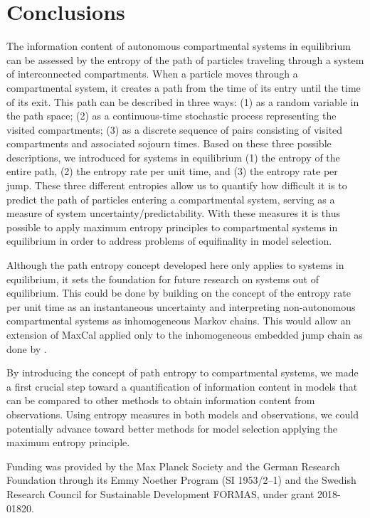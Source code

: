 \documentclass[smallextended]{svjour3}
\begin{document}
\section{Conclusions}
The information content of autonomous compartmental systems in equilibrium can be assessed by the entropy of the path of particles traveling through a system of interconnected compartments. When a particle moves through a compartmental system, it creates a path from the time of its entry until the time of its exit. This path can be described in three ways: (1) as a random variable in the path space; (2) as a continuous-time stochastic process representing the visited compartments; (3) as a discrete sequence of pairs consisting of visited compartments and associated sojourn times. 
Based on these three possible descriptions, we introduced for systems in equilibrium (1) the entropy of the entire path, (2) the entropy rate per unit time, and (3) the entropy rate per jump. These three different entropies allow us to quantify how difficult it is to predict the path of particles entering a compartmental system, serving as a measure of system uncertainty/predictability. With these measures it is thus possible to apply maximum entropy principles to compartmental systems in equilibrium in order to address problems of equifinality in model selection. 

Although the path entropy concept developed here only applies to systems in equilibrium, it sets the foundation for future research on systems out of equilibrium. 
This could be done by building on the concept of the entropy rate per unit time as an instantaneous uncertainty and interpreting non-autonomous compartmental systems as inhomogeneous Markov chains.
This would allow an extension of MaxCal applied only to the inhomogeneous embedded jump chain as done by \citet{Ge2012JCP}.

By introducing the concept of path entropy to compartmental systems, we made a first crucial step toward a quantification of information content in models that can be compared to other methods to obtain information content from observations. Using entropy measures in both models and observations, we could potentially advance toward better methods for model selection applying the maximum entropy principle. 

\newpage

\begin{acknowledgements}
Funding was provided by the Max Planck Society and the German Research Foundation through its Emmy Noether Program (SI 1953/2--1) and the Swedish Research Council for Sustainable Development FORMAS, under grant 2018-01820.
\end{acknowledgements}
\end{document}
